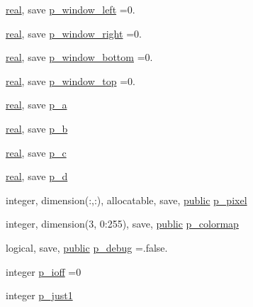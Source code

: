 \begin{DoxyCompactItemize}
\item 
\hyperlink{read__watch_83_8txt_abdb62bde002f38ef75f810d3a905a823}{real}, save \hyperlink{namespacem__pixel_a03d347205feb2f06305a014717de8b26}{p\+\_\+window\+\_\+left} =0.
\item 
\hyperlink{read__watch_83_8txt_abdb62bde002f38ef75f810d3a905a823}{real}, save \hyperlink{namespacem__pixel_a213461921eae5a7ec6d2eb399cf849da}{p\+\_\+window\+\_\+right} =0.
\item 
\hyperlink{read__watch_83_8txt_abdb62bde002f38ef75f810d3a905a823}{real}, save \hyperlink{namespacem__pixel_a5956f9820f460143df9022d9eb7f833d}{p\+\_\+window\+\_\+bottom} =0.
\item 
\hyperlink{read__watch_83_8txt_abdb62bde002f38ef75f810d3a905a823}{real}, save \hyperlink{namespacem__pixel_ab8c6c7f81ee857e70e77b08de015d416}{p\+\_\+window\+\_\+top} =0.
\item 
\hyperlink{read__watch_83_8txt_abdb62bde002f38ef75f810d3a905a823}{real}, save \hyperlink{namespacem__pixel_a67dc9122cf985392ef839d0e01bdd175}{p\+\_\+a}
\item 
\hyperlink{read__watch_83_8txt_abdb62bde002f38ef75f810d3a905a823}{real}, save \hyperlink{namespacem__pixel_a54a88e65093f2eebae449b44eb9188ed}{p\+\_\+b}
\item 
\hyperlink{read__watch_83_8txt_abdb62bde002f38ef75f810d3a905a823}{real}, save \hyperlink{namespacem__pixel_a4f7e47e7c8108aea8b5e41bc4cde3cf4}{p\+\_\+c}
\item 
\hyperlink{read__watch_83_8txt_abdb62bde002f38ef75f810d3a905a823}{real}, save \hyperlink{namespacem__pixel_aedcfb264a04a70d3dba9dc7c347bdf37}{p\+\_\+d}
\item 
integer, dimension(\+:,\+:), allocatable, save, \hyperlink{M__stopwatch_83_8txt_a2f74811300c361e53b430611a7d1769f}{public} \hyperlink{namespacem__pixel_abdde5773f7569de72bb28d6818a44914}{p\+\_\+pixel}
\item 
integer, dimension(3, 0\+:255), save, \hyperlink{M__stopwatch_83_8txt_a2f74811300c361e53b430611a7d1769f}{public} \hyperlink{namespacem__pixel_aa6b9c445365db696d6a7a9a794ceba43}{p\+\_\+colormap}
\item 
logical, save, \hyperlink{M__stopwatch_83_8txt_a2f74811300c361e53b430611a7d1769f}{public} \hyperlink{namespacem__pixel_aa98d89b6e06aa65bb897ee27901ab8ce}{p\+\_\+debug} =.false.
\item 
integer \hyperlink{namespacem__pixel_a7dfccfa543f53e4f6bd06a28f963ee69}{p\+\_\+ioff} =0
\item 
integer \hyperlink{namespacem__pixel_aea6d1d5a4f88e0b07db43e92463bb065}{p\+\_\+just1}

\end{DoxyCompactItemize}
